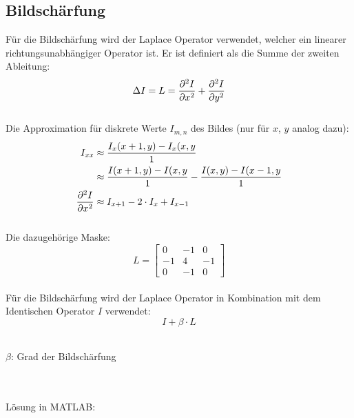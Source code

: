 \subsection{Bildschärfung}
Für die Bildschärfung wird der Laplace Operator verwendet, welcher ein linearer richtungsunabhängiger Operator ist.
Er ist definiert als die Summe der zweiten Ableitung:
\[
	\Delta I = L = \frac{\partial ^2 I}{\partial x^2} + \frac{\partial ^2 I}{\partial y^2}
\]
~\\
Die Approximation für diskrete Werte $I_{m,n}$ des Bildes (nur für $x$, $y$ analog dazu):
\[\begin{aligned}
	I_{xx} &\approx \frac{I_x(x+1,y)-I_x(x,y}{1} \\
	&\approx \frac{I(x+1,y)-I(x,y}{1} - \frac{I(x,y)-I(x-1,y}{1}\\
	\frac{\partial ^2 I}{\partial x^2} &\approx I_{x+1} - 2 \cdot I_x + I_{x-1}
\end{aligned}\]
~\\
Die dazugehörige Maske:
\[
	L = \left[ \begin{matrix}
	0 & -1 & 0\\
	-1 & 4 & -1\\
	0 & -1 & 0
	\end{matrix} \right]
\]
~\\
Für die Bildschärfung wird der Laplace Operator in Kombination mit dem Identischen Operator $I$ verwendet:
\[
	I + \beta \cdot L
\]
~\\
\begin{footnotesize}
$\beta$: Grad der Bildschärfung
\end{footnotesize}
\\\\
Lösung in MATLAB:
\lstset{language=Matlab}

~\\
